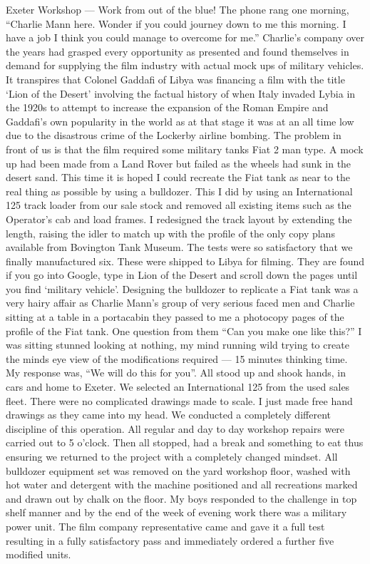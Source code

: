 Exeter Workshop --- Work from out of the blue! The phone rang one morning,
``Charlie Mann here. Wonder if you could journey down to me this morning. I
have a job I think you could manage to overcome for me.'' Charlie's company
over the years had grasped every opportunity as presented and found themselves
in demand for supplying the film industry with actual mock ups of military
vehicles. It transpires that Colonel Gaddafi of Libya was financing a film with
the title `Lion of the Desert' involving the factual history of when Italy
invaded Lybia in the 1920s to attempt to increase the expansion of the Roman
Empire and Gaddafi's own popularity in the world as at that stage it was at an
all time low due to the disastrous crime of the Lockerby airline bombing. The
problem in front of us is that the film required some military tanks Fiat 2 man
type. A mock up had been made from a Land Rover but failed as the wheels had
sunk in the desert sand. This time it is hoped I could recreate the Fiat tank
as near to the real thing as possible by using a bulldozer. This I did by using
an International 125 track loader from our sale stock and removed all existing
items such as the Operator's cab and load frames. I redesigned the track layout
by extending the length, raising the idler to match up with the profile of the
only copy plans available from Bovington Tank Museum. The tests were so
satisfactory that we finally manufactured six. These were shipped to Libya for
filming. They are found if you go into Google, type in Lion of the Desert and
scroll down the pages until you find `military vehicle'. Designing the
bulldozer to replicate a Fiat tank was a very hairy affair as Charlie Mann's
group of very serious faced men and Charlie sitting at a table in a portacabin
they passed to me a photocopy pages of the profile of the Fiat tank. One
question from them ``Can you make one like this?'' I was sitting stunned
looking at nothing, my mind running wild trying to create the minds eye view of
the modifications required --- 15 minutes thinking time. My response was, ``We
will do this for you''. All stood up and shook hands, in cars and home to
Exeter. We selected an International 125 from the used sales fleet. There were
no complicated drawings made to scale. I just made free hand drawings as they
came into my head. We conducted a completely different discipline of this
operation. All regular and day to day workshop repairs were carried out to 5
o'clock. Then all stopped, had a break and something to eat thus ensuring we
returned to the project with a completely changed mindset. All bulldozer
equipment set was removed on the yard workshop floor, washed with hot water and
detergent with the machine positioned and all recreations marked and drawn out
by chalk on the floor. My boys responded to the challenge in top shelf manner
and by the end of the week of evening work there was a military power unit. The
film company representative came and gave it a full test resulting in a fully
satisfactory pass and immediately ordered a further five modified units.

